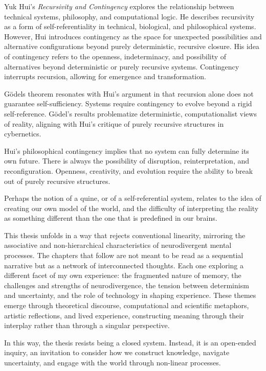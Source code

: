 Yuk Hui's \textit{Recursivity and Contingency} \citep{hui2019} explores the relationship between technical systems, philosophy, and computational logic. He describes recursivity as a form of self-referentiality in technical, biological, and philosophical systems. However, Hui introduces contingency as the space for unexpected possibilities and alternative configurations beyond purely deterministic, recursive closure. His idea of contingency refers to the openness, indeterminacy, and possibility of alternatives beyond deterministic or purely recursive systems. Contingency interrupts recursion, allowing for emergence and transformation.

Gödels theorem resonates with Hui's argument in that recursion alone does not guarantee self-sufficiency. Systems require contingency to evolve beyond a rigid self-reference. Gödel's results problematize deterministic, computationalist views of reality, aligning with Hui's critique of purely recursive structures in cybernetics.

Hui's philosophical contingency implies that no system can fully determine its own future. There is always the possibility of disruption, reinterpretation, and reconfiguration. Openness, creativity, and evolution require the ability to break out of purely recursive structures.

Perhaps the notion of a quine, or of a self-referential system, relates to the idea of creating our own model of the world, and the difficulty of interpreting the reality as something different than the one that is predefined in our brains. 

This thesis unfolds in a way that rejects conventional linearity, mirroring the associative and non-hierarchical characteristics of neurodivergent mental processes. The chapters that follow are not meant to be read as a sequential narrative but as a network of interconnected thoughts. Each one exploring a different facet of my own experience: the fragmented nature of memory, the challenges and strengths of neurodivergence, the tension between determinism and uncertainty, and the role of technology in shaping experience. These themes emerge through theoretical discourse, computational and scientific metaphors, artistic reflections, and lived experience, constructing meaning through their interplay rather than through a singular perspective.

In this way, the thesis resists being a closed system. Instead, it is an open-ended inquiry, an invitation to consider how we construct knowledge, navigate uncertainty, and engage with the world through non-linear processes.

\footnotesize 
\begin{tcolorbox}[colback=gray!20, colframe=black, arc=2mm, boxrule=0.8pt]
\end{tcolorbox}
\normalsize